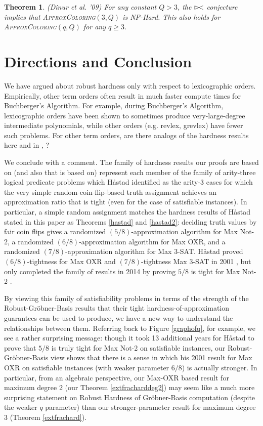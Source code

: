 \documentclass{article}
\newtheorem{theorem}{Theorem}[]
\newcommand{\mytie}{\mathrel{\rhd\mspace{-9mu}<}}
\begin{document}
\begin{theorem} (Dinur et al. '09)
For any constant $Q>3$, the $\mytie$ conjecture implies that \textsc{ApproxColoring}$(3,Q)$ is NP-Hard. This also holds for \textsc{ApproxColoring}$(q,Q)$ for any $q\geq 3$.
\end{theorem}





\section{Directions and Conclusion}

We have argued about robust hardness only with respect to lexicographic orders. Empirically, other term orders often result in much faster compute times for Buchberger's Algorithm. For example, during Buchberger's Algorithm, lexicographic orders have been shown to sometimes produce very-large-degree intermediate polynomials, while other orders (e.g. revlex, grevlex) have fewer such problems. For other term orders, are there analogs of the hardness results here and in \citep{deloera}, \citep{RS}?

We conclude with a comment.  The family of hardness results our proofs are based on (and also that \citep{RS} is based on) represent each member of the family of arity-three logical predicate problems which H{\aa}stad identified as the arity-3 cases for which the very simple random-coin-flip-based truth assignment achieves an approximation ratio that is tight (even for the case of satisfiable instances). In particular, a simple random assignment matches the hardness results of H{\aa}stad stated in this paper as Theorems \ref{hastad} and \ref{hastad2}: deciding truth values by fair coin flips gives a randomized $(5/8)$-approximation algorithm for Max Not-2, a randomized $(6/8)$-approximation algorithm for Max OXR, and a randomized $(7/8)$-approximation algorithm for Max 3-SAT. H{\aa}stad proved $(6/8)$-tightness for Max OXR and $(7/8)$-tightness Max 3-SAT in 2001 \citep{hast01}, but only completed the family of results in 2014 by proving $5/8$ is tight for Max Not-2 \citep{hast14}.

By viewing this family of satisfiability problems in terms of the strength of the Robust-Gr\"{o}bner-Basis results that their tight hardness-of-approximation guarantees can be used to produce, we have a new way to understand the relationships between them. Referring back to Figure \ref{graphofq}, for example, we see a rather surprising message: though it took 13 additional years for H{\aa}stad to prove that $5/8$ is truly tight for Max Not-2 on satisfiable instances, our Robust-Gr\"{o}bner-Basis view shows that there is a sense in which his 2001 result for Max OXR on satisfiable instances (with weaker parameter $6/8$) is actually stronger. In particular, from an algebraic perspective, our Max-OXR based result for maximum degree 2 (our Theorem \ref{extfracharddeg2}) may seem like a much more surprising statement on Robust Hardness of Gr\"{o}bner-Basis computation (despite the weaker $q$ parameter) than our stronger-parameter result for maximum degree 3 (Theorem \ref{extfrachard}).



\end{document}
